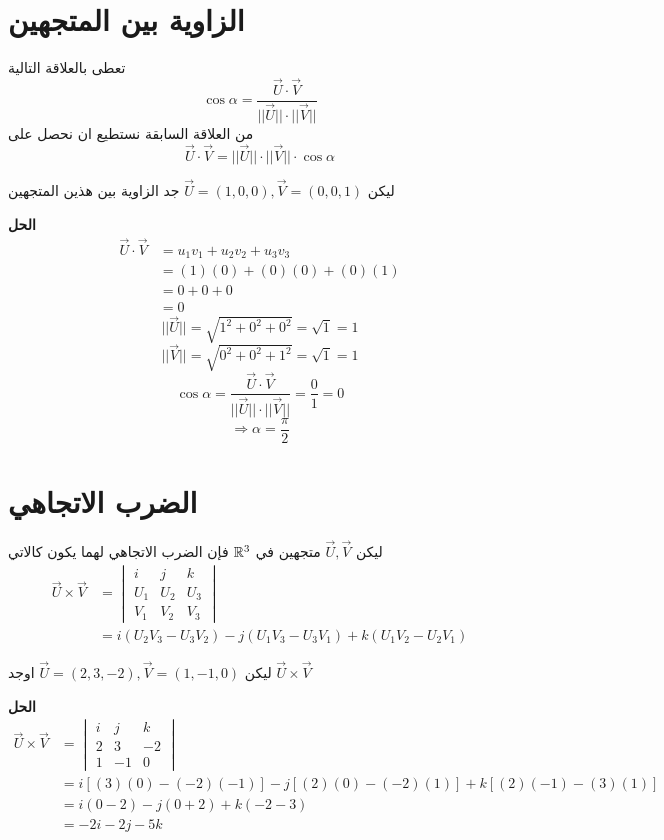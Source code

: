 \section{الزاوية بين المتجهين}
تعطى بالعلاقة التالية
\[
\cos\alpha = \frac{\vec{U}\cdot\vec{V}}{||\vec{U}|| \cdot ||\vec{V}||}
\]
من العلاقة السابقة نستطيع ان نحصل على
\[
\vec{U}\cdot\vec{V} = ||\vec{U}|| \cdot||\vec{V}||\cdot \cos \alpha
\]

\begin{example}
	ليكن 
	$\vec{U}=(1,0,0), \vec{V}=(0,0,1)$
	جد الزاوية بين هذين المتجهين 
\end{example}
\noindent
\textbf{الحل}
\begin{align*}
	\vec{U}\cdot\vec{V} &= u_1v_1 + u_2 v_2 + u_3 v_3\\
	&= (1)(0) + (0)(0) + (0)(1)\\
	&= 0+0+0\\
	&=0
\end{align*}
\[
||\vec{U}|| = \sqrt{1^2 + 0^2 + 0^2} = \sqrt{1} =1
\]
\[
||\vec{V}|| = \sqrt{0^2 + 0^2 + 1^2} = \sqrt{1} =1
\]
\[
\cos\alpha = \frac{\vec{U}\cdot\vec{V}}{||\vec{U}|| \cdot ||\vec{V}||} =  \frac{0}{1} = 0
\]
\[
\Rightarrow \alpha =\frac{\pi}{2}
\]

\section{الضرب الاتجاهي}
ليكن $\vec{U}, \vec{V}$ متجهين في $\mathbb{R}^3$ فإن الضرب الاتجاهي لهما يكون كالاتي
\begin{align*}
	\vec{U}\times\vec{V} & = 
	\begin{vmatrix}
		i & j & k\\
		U_1 & U_2 & U_3\\
		V_1 & V_2 & V_3
	\end{vmatrix}\\
	&= i(U_2V_3 - U_3V_2 ) -j(U_1V_3 - U_3V_1) + k(U_1V_2 - U_2V_1)
\end{align*}
\begin{example}
	ليكن
	$\vec{U} = (2,3,-2), \vec{V} = (1,-1,0)$ 
	اوجد $\vec{U}\times\vec{V}$
\end{example}
\noindent
\textbf{الحل}
\begin{align*}
	\vec{U}\times\vec{V} & = 
	\begin{vmatrix}
		i & j & k\\
		2 & 3 & -2\\
		1 & -1 & 0
	\end{vmatrix}\\
	&= i[(3)(0) - (-2)(-1)] -j[(2)(0) - (-2)(1)] + k[(2)(-1) -(3)(1)]\\
	&= i(0-2) - j(0+2) + k(-2-3)\\
	&= -2i -2j -5k
\end{align*}

